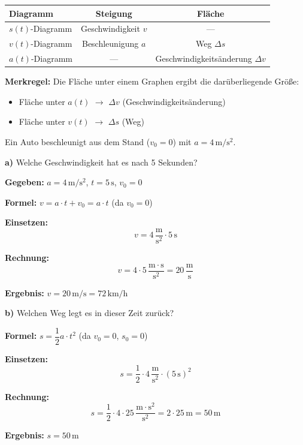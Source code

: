 \documentclass[11pt,a4paper]{article}
\begin{document}
\begin{formelbox}
\begin{center}
\renewcommand{\arraystretch}{1.5}
\begin{tabular}{|l|c|c|}
\hline
\rowcolor{lightblue}
\textbf{Diagramm} & \textbf{Steigung} & \textbf{Fläche} \\
\hline
$s(t)$-Diagramm & Geschwindigkeit $v$ & --- \\
\hline
$v(t)$-Diagramm & Beschleunigung $a$ & Weg $\Delta s$ \\
\hline
$a(t)$-Diagramm & --- & Geschwindigkeitsänderung $\Delta v$ \\
\hline
\end{tabular}
\end{center}

\vspace{0.3cm}
\textbf{Merkregel:} Die Fläche unter einem Graphen ergibt die darüberliegende Größe:
\begin{itemize}
\item Fläche unter $a(t)$ $\rightarrow$ $\Delta v$ (Geschwindigkeitsänderung)
\item Fläche unter $v(t)$ $\rightarrow$ $\Delta s$ (Weg)
\end{itemize}
\end{formelbox}

\begin{beispiel}
Ein Auto beschleunigt aus dem Stand ($v_0 = 0$) mit $a = 4\,\mathrm{m/s^2}$.

\textbf{a)} Welche Geschwindigkeit hat es nach 5 Sekunden?

\textbf{Gegeben:} $a = 4\,\mathrm{m/s^2}$, \quad $t = 5\,\mathrm{s}$, \quad $v_0 = 0$

\textbf{Formel:} $v = a \cdot t + v_0 = a \cdot t$ \quad (da $v_0 = 0$)

\textbf{Einsetzen:}
\[
v = 4\,\frac{\mathrm{m}}{\mathrm{s}^2} \cdot 5\,\mathrm{s}
\]

\textbf{Rechnung:}
\[
v = 4 \cdot 5\,\frac{\mathrm{m} \cdot \mathrm{s}}{\mathrm{s}^2} = 20\,\frac{\mathrm{m}}{\mathrm{s}}
\]

\textbf{Ergebnis:} $\boxed{v = 20\,\mathrm{m/s} = 72\,\mathrm{km/h}}$

\vspace{0.3cm}
\textbf{b)} Welchen Weg legt es in dieser Zeit zurück?

\textbf{Formel:} $s = \dfrac{1}{2} a \cdot t^2$ \quad (da $v_0 = 0$, $s_0 = 0$)

\textbf{Einsetzen:}
\[
s = \frac{1}{2} \cdot 4\,\frac{\mathrm{m}}{\mathrm{s}^2} \cdot (5\,\mathrm{s})^2
\]

\textbf{Rechnung:}
\[
s = \frac{1}{2} \cdot 4 \cdot 25\,\frac{\mathrm{m} \cdot \mathrm{s}^2}{\mathrm{s}^2} = 2 \cdot 25\,\mathrm{m} = 50\,\mathrm{m}
\]

\textbf{Ergebnis:} $\boxed{s = 50\,\mathrm{m}}$
\end{beispiel}
\end{document}

